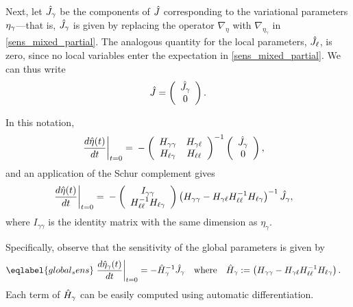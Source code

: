 Next, let $\hat J_\gamma$ be the components of
$\hat J$ corresponding to the variational parameters
$\eta_{\gamma}$---that is, $\hat J_\gamma$ is given by replacing
the operator $\nabla_\eta$ with $\nabla_{\eta_\gamma}$ in \eqref{sens_mixed_partial}.
The analogous quantity for the local parameters, $\hat J_\ell$,
is zero, since no local variables enter the expectation in \eqref{sens_mixed_partial}.
We can thus write
\begin{align*}
  \hat J = \left( \begin{array}{c} \hat J_\gamma \\ 0 \end{array}\right).
\end{align*}

In this notation,
%
\begin{align*}
%
\fracat{d \etaopt(\t)}{d \t}{t = 0} ={}&
-\left(
\begin{array}{cc}
   \hess{\gamma\gamma} & \hess{\gamma\ell} \\
   \hess{\ell\gamma}     & \hess{\ell\ell} \\
\end{array}
\right)^{-1}
\left( \begin{array}{c} \crosshessian_\gamma \\ 0 \end{array}\right),
%
\end{align*}
%
and an application of the Schur complement gives
%
\begin{align*}
%
\fracat{d \etaopt(\t)}{d \t}{t = 0} ={}&
-\left(\begin{array}{c}
I_{\gamma\gamma} \\
\hess{\ell\ell}^{-1} \hess{\ell\gamma}
\end{array}\right)
\left(\hess{\gamma\gamma} -
      \hess{\gamma\ell} \hess{\ell\ell}^{-1} \hess{\ell\gamma}\right)^{-1} \crosshessian_\gamma,
%
\end{align*}
where $I_{\gamma\gamma}$ is the identity matrix with
the same dimension as $\eta_\gamma$.

Specifically, observe that the sensitivity of the global parameters
is given by
\begin{align}\eqlabel{global_sens}
  \fracat{d \etaopt_\gamma(\t)}{d \t}{t = 0} &=
  - \hessopt_\gamma^{-1}\crosshessian_\gamma
  \mathwhere
  \hessopt_\gamma := \left(\hess{\gamma\gamma} -
        \hess{\gamma\ell} \hess{\ell\ell}^{-1} \hess{\ell\gamma}\right).
\end{align}
Each term of $\hat{H}_\gamma$ can be easily computed using automatic differentiation.

